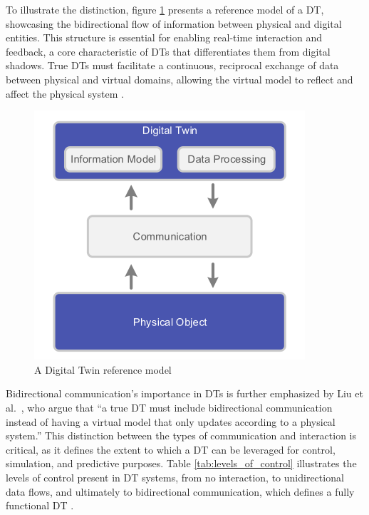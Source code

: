 To illustrate the distinction, figure \ref{f:dt-structure} presents a reference model of a \ac{DT}, showcasing the bidirectional flow of information between physical and digital entities. This structure is essential for enabling real-time interaction and feedback, a core characteristic of \ac{DTs} that differentiates them from digital shadows. True \ac{DTs} must facilitate a continuous, reciprocal exchange of data between physical and virtual domains, allowing the virtual model to reflect and affect the physical system \cite{dt_model}.

\begin{figure}[!htpb]
    \centering
    \includegraphics[width=0.4\linewidth]{figs/dt_reference_model.png}
    \caption{A Digital Twin reference model \cite{dt_model}}
    \label{f:dt-structure}
\end{figure}


Bidirectional communication's importance in \ac{DTs} is further emphasized by Liu et al.~, who argue that “a true DT must include bidirectional communication instead of having a virtual model that only updates according to a physical system.” This distinction between the types of communication and interaction is critical, as it defines the extent to which a \ac{DT} can be leveraged for control, simulation, and predictive purposes.
Table \ref{tab:levels_of_control} illustrates the levels of control present in DT systems, from no interaction, to unidirectional data flows, and ultimately to bidirectional communication, which defines a fully functional DT \cite{liu2022state}.

